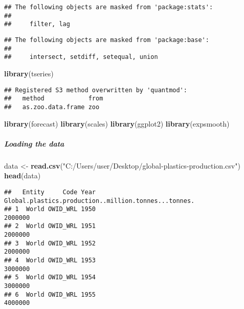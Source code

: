 \documentclass[
]{article}
\newenvironment{Shaded}{\begin{snugshade}}{\end{snugshade}}
\newcommand{\KeywordTok}[1]{\textcolor[rgb]{0.13,0.29,0.53}{\textbf{#1}}}
\newcommand{\NormalTok}[1]{#1}
\newcommand{\StringTok}[1]{\textcolor[rgb]{0.31,0.60,0.02}{#1}}
\begin{document}
\begin{verbatim}
## The following objects are masked from 'package:stats':
## 
##     filter, lag
\end{verbatim}

\begin{verbatim}
## The following objects are masked from 'package:base':
## 
##     intersect, setdiff, setequal, union
\end{verbatim}

\begin{Shaded}
\begin{Highlighting}[]
\KeywordTok{library}\NormalTok{(tseries)}
\end{Highlighting}
\end{Shaded}

\begin{verbatim}
## Registered S3 method overwritten by 'quantmod':
##   method            from
##   as.zoo.data.frame zoo
\end{verbatim}

\begin{Shaded}
\begin{Highlighting}[]
\KeywordTok{library}\NormalTok{(forecast)}
\KeywordTok{library}\NormalTok{(scales)}
\KeywordTok{library}\NormalTok{(ggplot2)}
\KeywordTok{library}\NormalTok{(expsmooth)}
\end{Highlighting}
\end{Shaded}

\hypertarget{loading-the-data}{%
\subparagraph{Loading the data}\label{loading-the-data}}

\begin{Shaded}
\begin{Highlighting}[]
\NormalTok{data \textless{}{-}}\StringTok{ }\KeywordTok{read.csv}\NormalTok{(}\StringTok{"C:/Users/user/Desktop/global{-}plastics{-}production.csv"}\NormalTok{)}
\KeywordTok{head}\NormalTok{(data)}
\end{Highlighting}
\end{Shaded}

\begin{verbatim}
##   Entity     Code Year Global.plastics.production..million.tonnes...tonnes.
## 1  World OWID_WRL 1950                                              2000000
## 2  World OWID_WRL 1951                                              2000000
## 3  World OWID_WRL 1952                                              2000000
## 4  World OWID_WRL 1953                                              3000000
## 5  World OWID_WRL 1954                                              3000000
## 6  World OWID_WRL 1955                                              4000000
\end{verbatim}
\end{document}
